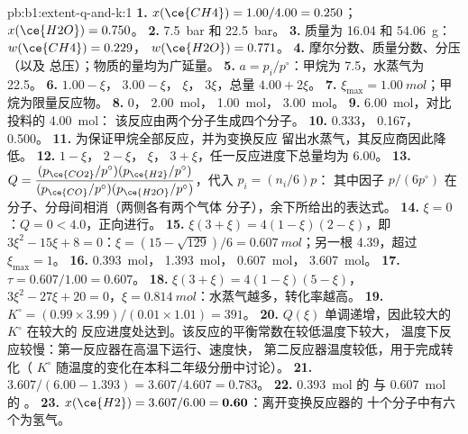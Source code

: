 \begin{solution}{pb:b1:extent-q-and-k:1}
\textbf{1.} $x(\ce{CH4}) = 1.00/4.00 = 0.250$；$x(\ce{H2O}) = 0.750$。
\textbf{2.} \qty{7.5}{bar} 和 \qty{22.5}{bar}。
\textbf{3.} 质量为 16.04 和 \qty{54.06}{g}：$w(\ce{CH4}) = 0.229$，
$w(\ce{H2O}) = 0.771$。
\textbf{4.} 摩尔分数、质量分数、分压（以及
总压）；物质的量均为广延量。
\textbf{5.} $a = p_i/p^\circ$：甲烷为 7.5，水蒸气为 22.5。
\textbf{6.}  $1.00 - \xi$， $3.00 - \xi$， $\xi$，
 $3\xi$，总量 $4.00 + 2\xi$。
\textbf{7.} $\xi_{\max} = \qty{1.00}{mol}$；甲烷为限量反应物。
\textbf{8.}  0， \qty{2.00}{mol}， \qty{1.00}{mol}，
 \qty{3.00}{mol}。
\textbf{9.} \qty{6.00}{mol}，对比投料的 \qty{4.00}{mol}：
该反应由两个分子生成四个分子。
\textbf{10.}  0.333， 0.167， 0.500。
\textbf{11.} 为保证甲烷全部反应，并为变换反应
留出水蒸气，其反应商因此降低。
\textbf{12.}  $1 - \xi$， $2 - \xi$， $\xi$，
$3 + \xi$，任一反应进度下总量均为 6.00。
\textbf{13.} $Q = \dfrac{(p_{\ce{CO2}}/p^\circ)(p_{\ce{H2}}/p^\circ)}
{(p_{\ce{CO}}/p^\circ)(p_{\ce{H2O}}/p^\circ)}$，代入 $p_i = (n_i/6)p$：
其中因子 $p/(6p^\circ)$ 在分子、分母间相消（两侧各有两个气体
分子），余下所给出的表达式。
\textbf{14.} $\xi = 0$：$Q = 0 < 4.0$，正向进行。
\textbf{15.} $\xi(3 + \xi) = 4(1 - \xi)(2 - \xi)$，即 $3\xi^2 - 15\xi +
8 = 0$：$\xi = (15 - \sqrt{129})/6 = \qty{0.607}{mol}$；另一根
4.39，超过 $\xi_{\max} = 1$。
\textbf{16.}  \qty{0.393}{mol}， \qty{1.393}{mol}，
 \qty{0.607}{mol}， \qty{3.607}{mol}。
\textbf{17.} $\tau = 0.607/1.00 = 0.607$。
\textbf{18.} $\xi(3 + \xi) = 4(1 - \xi)(5 - \xi)$，$3\xi^2 - 27\xi + 20 =
0$，$\xi = \qty{0.814}{mol}$：水蒸气越多，转化率越高。
\textbf{19.} $K^\circ = (0.99 \times 3.99)/(0.01 \times 1.01) = 391$。
\textbf{20.} $Q(\xi)$ 单调递增，因此较大的 $K^\circ$ 在较大的
反应进度处达到。该反应的平衡常数在较低温度下较大，
温度下反应较慢：第一反应器在高温下运行、速度快，
第二反应器温度较低，用于完成转化（
$K^\circ$ 随温度的变化在本科二年级分册中讨论）。
\textbf{21.} $3.607/(6.00 - 1.393) = 3.607/4.607 = 0.783$。
\textbf{22.} \qty{0.393}{mol} 的  与 \qty{0.607}{mol} 的 。
\textbf{23.} $x(\ce{H2}) = 3.607/6.00 = \textbf{0.60}$：离开变换反应器的
十个分子中有六个为氢气。
\end{solution}
